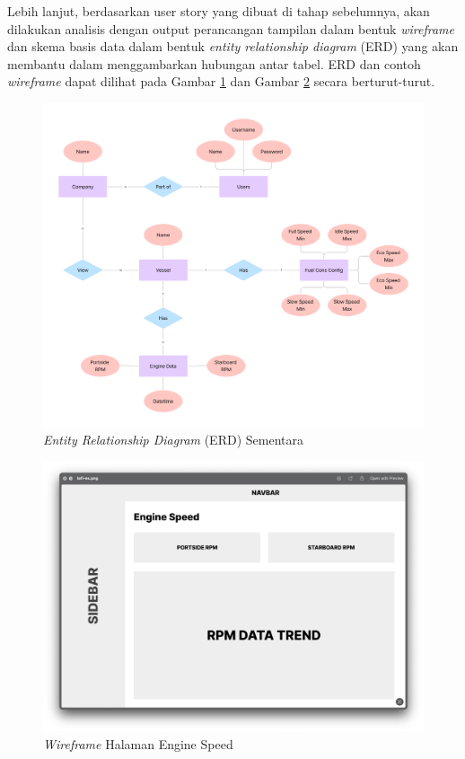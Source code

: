     Lebih lanjut, berdasarkan user story yang dibuat di tahap sebelumnya, akan dilakukan analisis dengan output perancangan tampilan dalam bentuk \textit{wireframe} dan skema basis data dalam bentuk \textit{entity relationship diagram} (ERD) yang akan membantu dalam menggambarkan hubungan antar tabel. ERD dan contoh \textit{wireframe} dapat dilihat pada Gambar \ref{fig:erd} dan Gambar \ref{fig:wireframe} secara berturut-turut.

    \begin{figure}[!h]
        \includegraphics[width=1\linewidth, center]{images/metode/erd.png}
        \caption{\textit{Entity Relationship Diagram} (ERD) Sementara}
        \label{fig:erd}
    \end{figure}

    \begin{figure}[!h]
        \includegraphics[width=1.1\linewidth, center]{images/hasil/iterations/1/lofi-es.png}
        \caption{\textit{Wireframe} Halaman Engine Speed}
        \label{fig:wireframe}
    \end{figure}


